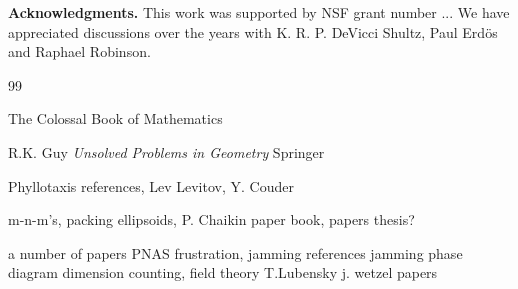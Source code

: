 \documentclass[superscriptaddress,reprint,amsmath,amssymb,aps]{revtex4-1}
\begin{document}


{\bf Acknowledgments.}
This work was supported by NSF grant number ... 
We have appreciated discussions over the years with K. R. P. DeVicci Shultz, Paul Erd\"os and Raphael Robinson.


\begin{thebibliography} {99}


 The Colossal Book of Mathematics

 R.K. Guy \textit{Unsolved Problems in Geometry} Springer

 Phyllotaxis references, Lev Levitov, Y. Couder

 m-n-m's, packing ellipsoids, P. Chaikin paper
  book, papers
 thesis?

 a number of papers
 PNAS
 frustration, jamming references
 jamming phase diagram
 dimension counting, field theory  T.Lubensky
 j. wetzel papers


\end{thebibliography}
\end{document}
